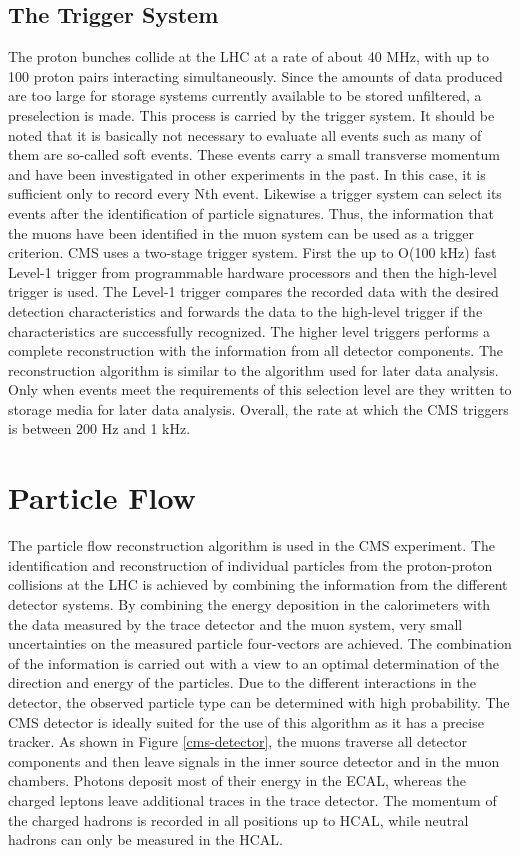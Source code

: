 \documentclass[12pt, a4paper]{thesis}
\begin{document}
\subsection{The Trigger System}
\label{sec:org9d9e9a7}
The proton bunches collide at the LHC at a rate of about 40 MHz, with
up to 100 proton pairs interacting simultaneously. Since the amounts
of data produced are too large for storage systems currently available
to be stored unfiltered, a preselection is made. This process is
carried by the trigger system. It should be noted that it is basically
not necessary to evaluate all events such as many of them are
so-called soft events. These events carry a small transverse momentum
and have been investigated in other experiments in the past. In this
case, it is sufficient only to record every Nth event. Likewise a
trigger system can select its events after the identification of
particle signatures. Thus, the information that the muons have been
identified in the muon system can be used as a trigger criterion. CMS
uses a two-stage trigger system. First the up to O(100 kHz) fast
Level-1 trigger from programmable hardware processors and then the
high-level trigger is used. The Level-1 trigger compares the recorded
data with the desired detection characteristics and forwards the data
to the high-level trigger if the characteristics are successfully
recognized. The higher level triggers performs a complete
reconstruction with the information from all detector components. The
reconstruction algorithm is similar to the algorithm used for later
data analysis. Only when events meet the requirements of this
selection level are they written to storage media for later data
analysis. Overall, the rate at which the CMS triggers is between 200
Hz and 1 kHz.

\clearpage
\section{Particle Flow}
\label{sec:eneryflow}

The particle flow reconstruction algorithm is used in the CMS
experiment. The identification and reconstruction of individual
particles from the proton-proton collisions at the LHC is achieved by
combining the information from the different detector systems. By
combining the energy deposition in the calorimeters with the data
measured by the trace detector and the muon system, very small
uncertainties on the measured particle four-vectors are achieved. The
combination of the information is carried out with a view to an
optimal determination of the direction and energy of the
particles. Due to the different interactions in the detector, the
observed particle type can be determined with high probability.  The
CMS detector is ideally suited for the use of this algorithm as it has
a precise tracker. As shown in Figure \ref{cms-detector}, the muons
traverse all detector components and then leave signals in the inner
source detector and in the muon chambers. Photons deposit most of
their energy in the ECAL, whereas the charged leptons leave additional
traces in the trace detector. The momentum of the charged hadrons is
recorded in all positions up to HCAL, while neutral hadrons can only
be measured in the HCAL.
\end{document}
